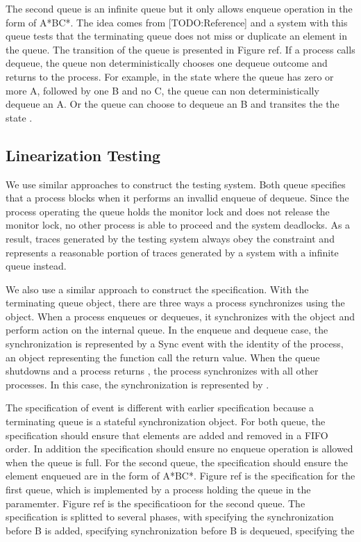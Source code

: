 \documentclass[a4paper, 12pt]{article}
\begin{document}
The second queue is an infinite queue but it only allows enqueue operation in the form of A*BC*. The idea comes from [TODO:Reference] and a system with this queue tests that the terminating queue does not miss or duplicate an element in the queue. The transition of the queue is presented in Figure ref. If a process calls dequeue, the queue non deterministically chooses one dequeue outcome and returns to the process. For example, in the state  where the queue has zero or more A, followed by one B and no C, the queue can non deterministically dequeue an A. Or the queue can choose to dequeue an B and transites the the state .

\subsection{Linearization Testing}
We use similar approaches to construct the testing system. Both queue specifies that a process blocks when it performs an invallid enqueue of dequeue. Since the process operating the queue holds the monitor lock and does not release the monitor lock, no other process is able to proceed and the system deadlocks. As a result, traces generated by the testing system always obey the constraint and represents a reasonable portion of traces generated by a system with a infinite queue instead. 

We also use a similar approach to construct the specification. With the terminating queue object, there are three ways a process synchronizes using the object. When a process enqueues or dequeues, it synchronizes with the object and perform action on the internal queue. In the enqueue and dequeue case, the synchronization is represented by a Sync event with the identity of the process, an object representing the function call the return value. When the queue shutdowns and a process returns , the process synchronizes with all other processes. In this case, the synchronization is represented by . 

The specification of  event is different with earlier  specification because a terminating queue is a stateful synchronization object. For both queue, the  specification should ensure that elements are added and removed in a FIFO order. In addition the  specification should ensure no enqueue operation is allowed when the queue is full. For the second queue, the  specification should ensure the element enqueued are in the form of A*BC*. Figure ref is the specification for the first queue, which is implemented by a process holding the queue in the paramemter. Figure ref is the specificatioon for the second queue. The specification is splitted to several phases, with  specifying the synchronization before B is added,  specifying synchronization before B is dequeued,  specifying the 
\end{document}
